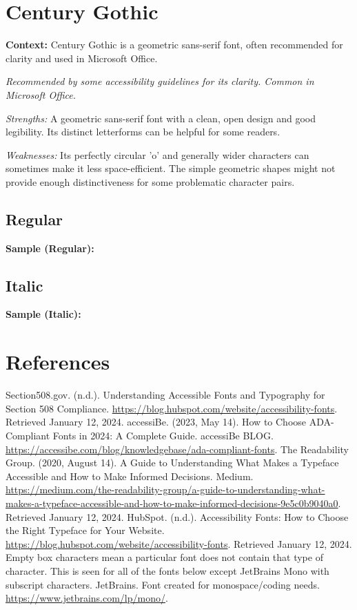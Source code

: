 \pagebreak
\section{Century Gothic}\label{sec:centurygothic}
\noindent
\textbf{Context:} Century Gothic is a geometric sans-serif font, often recommended for clarity and used in Microsoft Office.

\emph{Recommended by some accessibility guidelines for its clarity. Common in Microsoft Office.}
\begin{raggedright}
\emph{Strengths:} A geometric sans-serif font with a clean, open design and good legibility. Its distinct letterforms can be helpful for some readers.

\emph{Weaknesses:} Its perfectly circular 'o' and generally wider characters can sometimes make it less space-efficient. The simple geometric shapes might not provide enough distinctiveness for some problematic character pairs.

\subsection{Regular}
\noindent\textbf{Sample (Regular):}
\FontSample{\centurygothicfont}

\subsection{Italic}
\noindent\textbf{Sample (Italic):}
\FontSample{{\centurygothicfont\itshape}}
\end{raggedright}

\section{References}
\begin{thebibliography}{99}
 Section508.gov. (n.d.). Understanding Accessible Fonts and Typography for Section 508 Compliance. \url{https://blog.hubspot.com/website/accessibility-fonts}. Retrieved January 12, 2024.
 accessiBe. (2023, May 14). How to Choose ADA-Compliant Fonts in 2024: A Complete Guide. accessiBe BLOG. \url{https://accessibe.com/blog/knowledgebase/ada-compliant-fonts}.
 The Readability Group. (2020, August 14). A Guide to Understanding What Makes a Typeface Accessible and How to Make Informed Decisions. Medium. \url{https://medium.com/the-readability-group/a-guide-to-understanding-what-makes-a-typeface-accessible-and-how-to-make-informed-decisions-9e5c0b9040a0}. Retrieved January 12, 2024.
 HubSpot. (n.d.). Accessibility Fonts: How to Choose the Right Typeface for Your Website. \url{https://blog.hubspot.com/website/accessibility-fonts}. Retrieved January 12, 2024.
 Empty box characters mean a particular font does not contain that type of character. This is seen for all of the fonts below except JetBrains Mono with subscript characters.
 JetBrains. Font created for monospace/coding needs. \url{https://www.jetbrains.com/lp/mono/}.
\end{thebibliography}
